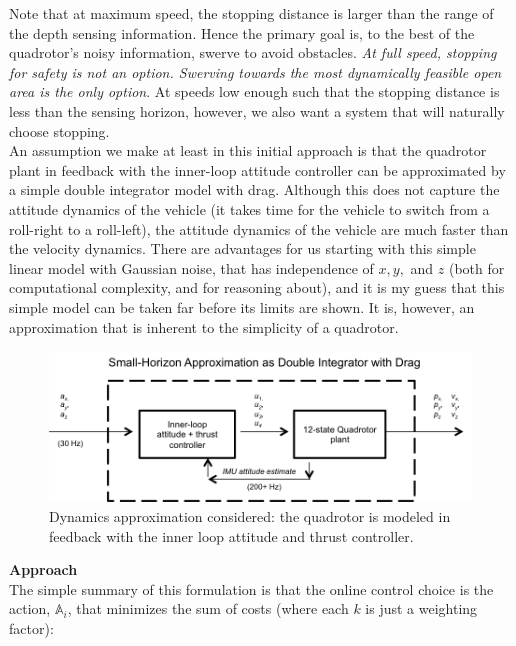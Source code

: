 \documentclass[paper=a4, fontsize=11pt]{scrartcl} %
\numberwithin{equation}{section} %
\numberwithin{figure}{section} %
\numberwithin{table}{section} %
\begin{document}
Note that at maximum speed, the stopping distance is larger than the range of the depth sensing information.  Hence the primary goal is, to the best of the quadrotor's noisy information, swerve to avoid obstacles. \textit{At full speed, stopping for safety is not an option. Swerving towards the most dynamically feasible open area is the only option}.  At speeds low enough such that the stopping distance is less than the sensing horizon, however, we also want a system that will naturally choose stopping. \\

An assumption we make at least in this initial approach is that the quadrotor plant in feedback with the inner-loop attitude controller can be approximated by a simple double integrator model with drag.  Although this does not capture the attitude dynamics of the vehicle (it takes time for the vehicle to switch from a roll-right to a roll-left), the attitude dynamics of the vehicle are much faster than the velocity dynamics.  There are advantages for us starting with this simple linear model with Gaussian noise, that has independence of $x, y,$ and $z$ (both for computational complexity, and for reasoning about), and it is my guess that this simple model can be taken far before its limits are shown. It is, however, an approximation that is inherent to the simplicity of a quadrotor.\\

\begin{figure}
  \includegraphics[width=\linewidth]{double_integrator_approximation.png}
  \caption{Dynamics approximation considered: the quadrotor is modeled in feedback with the inner loop attitude and thrust controller.}
  \label{fig:boat1}
\end{figure}

\textbf{Approach}
\\

The simple summary of this formulation is that the online control choice is the action, $\mathbb{A}_i$, that minimizes the sum of costs (where each $k$ is just a weighting factor):
\end{document}
